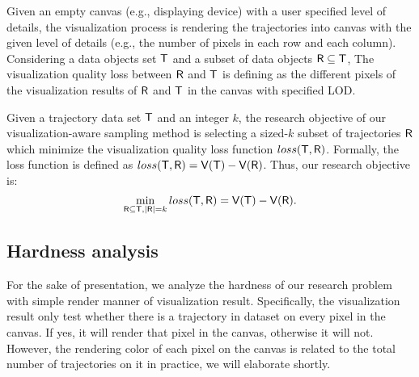 Given an empty canvas (e.g., displaying device) with a user specified level of details, the visualization process is rendering the trajectories into canvas with the given level of details (e.g., the number of pixels in each row and each column).
Considering a data objects set $\mathsf{T}$ and a subset of data objects $\mathsf{R} \subseteq \mathsf{T}$,
The visualization quality loss between $\mathsf{R}$ and $\mathsf{T}$ is defining as the different pixels of the visualization results of $\mathsf{R}$ and $\mathsf{T}$ in the canvas with specified LOD.

Given a trajectory data set $\mathsf{T}$ and an integer $k$,  the research objective of our visualization-aware sampling method is selecting a sized-$k$ subset of trajectories $\mathsf{R}$ which minimize the visualization quality loss function $loss(\mathsf{T}, \mathsf{R})$.
Formally, the loss function is defined as $loss(\mathsf{T}, \mathsf{R}) = \mathsf{V}(\mathsf{T}) - \mathsf{V}(\mathsf{R})$.
Thus, our research objective is:
$$ \min_{\mathsf{R} \subseteq \mathsf{T}, |\mathsf{R}| = k}  loss(\mathsf{T}, \mathsf{R}) =  \mathsf{V}(\mathsf{T}) - \mathsf{V}(\mathsf{R}). $$ %






\subsection{Hardness analysis}
For the sake of presentation, we analyze the hardness of our research problem with simple render manner of visualization result.
Specifically,  the visualization result only test whether there is a trajectory in dataset on every pixel in the canvas.
If yes, it will render that pixel in the canvas, otherwise it will not.
However, the rendering color of each pixel on the canvas is related to the total number of trajectories on it in practice, we will elaborate shortly.

